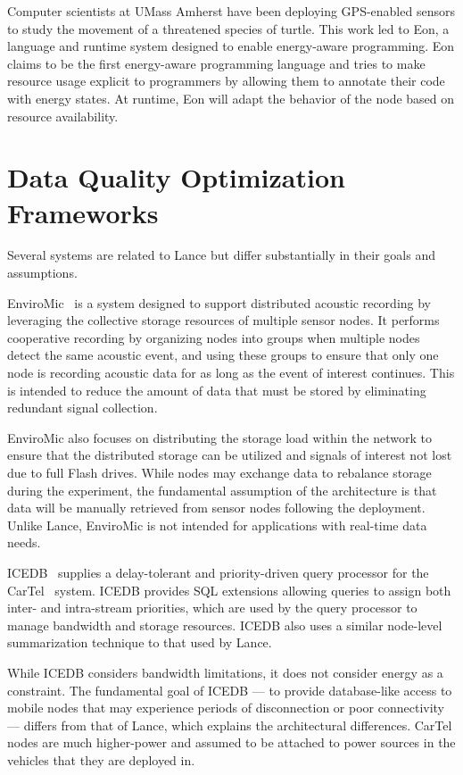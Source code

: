 Computer scientists at UMass Amherst have been deploying GPS-enabled sensors
to study the movement of a threatened species of turtle. This work led to
Eon, a language and runtime system designed to enable energy-aware
programming. Eon claims to be the first energy-aware programming language and
tries to make resource usage explicit to programmers by allowing them to
annotate their code with energy states. At runtime, Eon will adapt the
behavior of the node based on resource availability.

\section{Data Quality Optimization Frameworks}
\label{lance-sec-related}

Several systems are related to Lance but differ substantially in their goals
and assumptions.

EnviroMic~\cite{enviromic} is a system designed to support distributed
acoustic recording by leveraging the collective storage resources of multiple
sensor nodes. It performs cooperative recording by organizing nodes into
groups when multiple nodes detect the same acoustic event, and using these
groups to ensure that only one node is recording acoustic data for as long as
the event of interest continues. This is intended to reduce the amount of
data that must be stored by eliminating redundant signal collection.

EnviroMic also focuses on distributing the storage load within the network to
ensure that the distributed storage can be utilized and signals of interest
not lost due to full Flash drives. While nodes may exchange data to rebalance
storage during the experiment, the fundamental assumption of the architecture
is that data will be manually retrieved from sensor nodes following the
deployment. Unlike Lance, EnviroMic is not intended for applications with
real-time data needs.

ICEDB~\cite{zhang2007icedb} supplies a delay-tolerant and priority-driven
query processor for the CarTel~\cite{cartel} system. ICEDB provides SQL
extensions allowing queries to assign both inter- and intra-stream
priorities, which are used by the query processor to manage bandwidth and
storage resources. ICEDB also uses a similar node-level summarization
technique to that used by Lance.

While ICEDB considers bandwidth limitations, it does not consider energy as a
constraint. The fundamental goal of ICEDB --- to provide database-like access
to mobile nodes that may experience periods of disconnection or poor
connectivity --- differs from that of Lance, which explains the architectural
differences. CarTel nodes are much higher-power and assumed to be attached to
power sources in the vehicles that they are deployed in.

